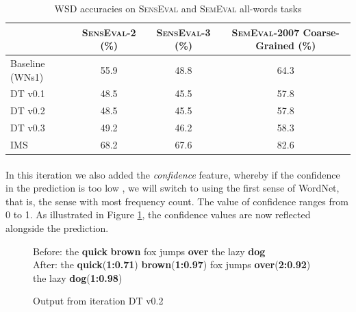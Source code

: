 \begin{table}
	\begin{tabular}[h]{| l | c | c | c |}
		\hline
		& \textsc{SensEval-2} (\%) & \textsc{SensEval-3} (\%) & \textsc{SemEval-2007} Coarse-Grained (\%) \\
		\hline
		Baseline (WNs1) & 55.9 & 48.8 & 64.3 \\
		\hline
		DT v0.1 & 48.5 & 45.5 & 57.8 \\
		\hline
		DT v0.2 & 48.5 & 45.5 & 57.8 \\
		\hline
		DT v0.3 & 49.2 & 46.2 & 58.3 \\
		\hline
		IMS & 68.2 & 67.6 & 82.6 \\
		\hline
	\end{tabular}
	\caption{WSD accuracies on \textsc{SensEval} and \textsc{SemEval} all-words tasks}
	\label{tab:resultsSum}
\end{table}

\paragraph{}
In this iteration we also added the \textit{confidence} feature, whereby if the confidence in the prediction is too low%
, we will switch to using the first sense of WordNet, that is, the sense with most frequency count. The value of confidence ranges from 0 to 1. As illustrated in Figure \ref{fig:outputDTv0.2}, the confidence values are now reflected alongside the prediction.

\begin{figure}[h]
\begin{flushleft}
\vspace{5 mm}
\hspace{10 mm}Before: the \textbf{quick} \textbf{brown} fox jumps \textbf{over} the lazy \textbf{dog} \\
\hspace{10 mm}After: the \textbf{quick}(\textbf{1:0.71}) \textbf{brown}(\textbf{1:0.97}) fox jumps \textbf{over}(\textbf{2:0.92}) the lazy \textbf{dog}(\textbf{1:0.98})
\end{flushleft}
\caption{Output from iteration DT v0.2}
\label{fig:outputDTv0.2}
\end{figure}

